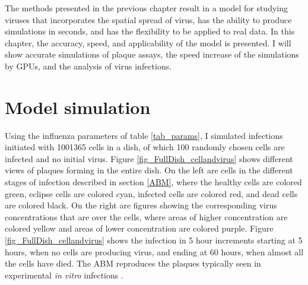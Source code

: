 
The methods presented in the previous chapter result in a model for studying viruses that incorporates the spatial spread of virus, has the ability to produce simulations in seconds, and has the flexibility to be applied to real data. In this chapter, the accuracy, speed, and applicability of the model is presented. I will show accurate simulations of plaque assays, the speed increase of the simulations by GPUs, and the analysis of virus infections.

\section{Model simulation}

Using the influenza parameters of table \ref{tab_params}, I simulated infections initiated with 1001365 cells in a dish, of which 100 randomly chosen cells are infected and no initial virus. Figure \ref{fig_FullDish_cellandvirus} shows different views of plaques forming in the entire dish. On the left are cells in the different stages of infection described in section \ref{ABM}, where the healthy cells are colored green, eclipse cells are colored cyan, infected cells are colored red, and dead cells are colored black. On the right are figures showing the corresponding virus concentrations that are over the cells, where areas of higher concentration are colored yellow and areas of lower concentration are colored purple. Figure \ref{fig_FullDish_cellandvirus} shows the infection in 5 hour increments starting at 5 hours, when no cells are producing virus, and ending at 60 hours, when almost all the cells have died. The ABM reproduces the plaques typically seen in experimental \emph{in vitro} infections \citep{holder11H274Y}. 

